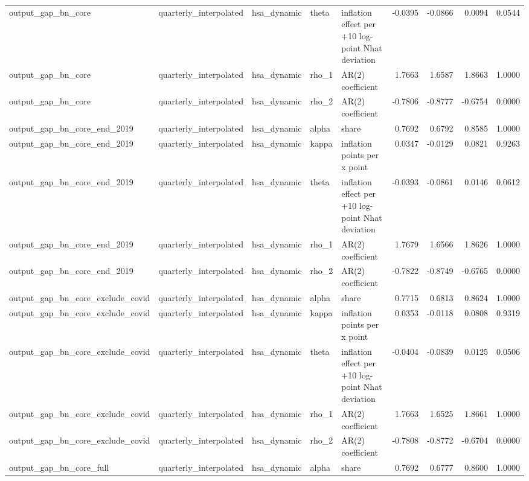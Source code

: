 \begin{tabular}{lllllrrrr}
output\_gap\_bn\_core & quarterly\_interpolated & hsa\_dynamic & theta & inflation effect per +10 log-point Nhat deviation & -0.0395 & -0.0866 & 0.0094 & 0.0544 \\
output\_gap\_bn\_core & quarterly\_interpolated & hsa\_dynamic & rho\_1 & AR(2) coefficient & 1.7663 & 1.6587 & 1.8663 & 1.0000 \\
output\_gap\_bn\_core & quarterly\_interpolated & hsa\_dynamic & rho\_2 & AR(2) coefficient & -0.7806 & -0.8777 & -0.6754 & 0.0000 \\
output\_gap\_bn\_core\_end\_2019 & quarterly\_interpolated & hsa\_dynamic & alpha & share & 0.7692 & 0.6792 & 0.8585 & 1.0000 \\
output\_gap\_bn\_core\_end\_2019 & quarterly\_interpolated & hsa\_dynamic & kappa & inflation points per x point & 0.0347 & -0.0129 & 0.0821 & 0.9263 \\
output\_gap\_bn\_core\_end\_2019 & quarterly\_interpolated & hsa\_dynamic & theta & inflation effect per +10 log-point Nhat deviation & -0.0393 & -0.0861 & 0.0146 & 0.0612 \\
output\_gap\_bn\_core\_end\_2019 & quarterly\_interpolated & hsa\_dynamic & rho\_1 & AR(2) coefficient & 1.7679 & 1.6566 & 1.8626 & 1.0000 \\
output\_gap\_bn\_core\_end\_2019 & quarterly\_interpolated & hsa\_dynamic & rho\_2 & AR(2) coefficient & -0.7822 & -0.8749 & -0.6765 & 0.0000 \\
output\_gap\_bn\_core\_exclude\_covid & quarterly\_interpolated & hsa\_dynamic & alpha & share & 0.7715 & 0.6813 & 0.8624 & 1.0000 \\
output\_gap\_bn\_core\_exclude\_covid & quarterly\_interpolated & hsa\_dynamic & kappa & inflation points per x point & 0.0353 & -0.0118 & 0.0808 & 0.9319 \\
output\_gap\_bn\_core\_exclude\_covid & quarterly\_interpolated & hsa\_dynamic & theta & inflation effect per +10 log-point Nhat deviation & -0.0404 & -0.0839 & 0.0125 & 0.0506 \\
output\_gap\_bn\_core\_exclude\_covid & quarterly\_interpolated & hsa\_dynamic & rho\_1 & AR(2) coefficient & 1.7663 & 1.6525 & 1.8661 & 1.0000 \\
output\_gap\_bn\_core\_exclude\_covid & quarterly\_interpolated & hsa\_dynamic & rho\_2 & AR(2) coefficient & -0.7808 & -0.8772 & -0.6704 & 0.0000 \\
output\_gap\_bn\_core\_full & quarterly\_interpolated & hsa\_dynamic & alpha & share & 0.7692 & 0.6777 & 0.8600 & 1.0000 \\

\end{tabular}
